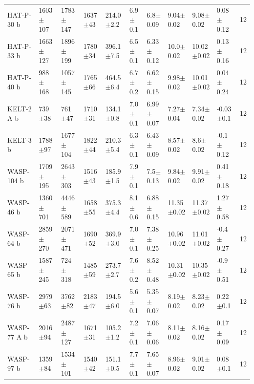 \begin{subappendices}
{\begin{landscape}
\begin{longtable}{llllllllllc}
  HAT-P-30 b  &    1603$\pm$107 &    1783$\pm$147 &   1637$\pm$43 &    214.0$\pm$2.2 &   6.9$\pm$0.1 &    6.8$\pm$0.09 &   9.04$\pm$0.02 &   9.08$\pm$0.02 &   0.08$\pm$0.12 &       12 \\
  HAT-P-33 b  &    1663$\pm$127 &    1896$\pm$199 &   1780$\pm$34 &    396.1$\pm$7.5 &   6.5$\pm$0.1 &   6.33$\pm$0.12 &   10.0$\pm$0.02 &  10.02$\pm$0.02 &   0.13$\pm$0.16 &       12 \\
  HAT-P-40 b  &     988$\pm$168 &    1057$\pm$145 &   1765$\pm$66 &    464.5$\pm$6.4 &   6.7$\pm$0.2 &   6.62$\pm$0.15 &   9.98$\pm$0.02 &  10.01$\pm$0.02 &   0.04$\pm$0.24 &       12 \\
  KELT-2 A b  &      739$\pm$38 &      761$\pm$47 &   1710$\pm$31 &    134.1$\pm$0.8 &   7.0$\pm$0.1 &   6.99$\pm$0.07 &   7.27$\pm$0.04 &   7.34$\pm$0.02 &   -0.03$\pm$0.1 &       12 \\
  KELT-3 b    &     1788$\pm$97 &    1677$\pm$104 &   1822$\pm$44 &    210.3$\pm$5.4 &   6.3$\pm$0.1 &   6.43$\pm$0.09 &   8.57$\pm$0.02 &    8.6$\pm$0.02 &   -0.1$\pm$0.12 &       12 \\
  WASP-104 b  &    1709$\pm$195 &    2643$\pm$303 &   1516$\pm$43 &    185.9$\pm$1.5 &   7.9$\pm$0.1 &    7.5$\pm$0.13 &   9.84$\pm$0.02 &   9.91$\pm$0.02 &   0.41$\pm$0.18 &       12 \\
  WASP-46 b   &    1360$\pm$701 &    4446$\pm$589 &   1658$\pm$55 &    375.3$\pm$4.4 &   8.1$\pm$0.6 &   6.88$\pm$0.15 &  11.35$\pm$0.02 &  11.37$\pm$0.02 &   1.27$\pm$0.58 &       12 \\
  WASP-64 b   &    2859$\pm$270 &    2071$\pm$471 &   1690$\pm$52 &    369.9$\pm$3.0 &   7.0$\pm$0.1 &   7.38$\pm$0.25 &  10.96$\pm$0.02 &  11.01$\pm$0.02 &   -0.4$\pm$0.27 &       12 \\
  WASP-65 b   &    1587$\pm$245 &     724$\pm$318 &   1485$\pm$59 &    273.7$\pm$2.7 &   7.6$\pm$0.2 &   8.52$\pm$0.48 &  10.31$\pm$0.02 &  10.35$\pm$0.02 &   -0.9$\pm$0.51 &       12 \\
  WASP-76 b   &     2979$\pm$63 &     3762$\pm$82 &   2183$\pm$47 &    194.5$\pm$6.0 &   5.6$\pm$0.1 &   5.35$\pm$0.07 &   8.19$\pm$0.02 &   8.23$\pm$0.02 &    0.22$\pm$0.1 &       12 \\
  WASP-77 A b &     2016$\pm$94 &    2487$\pm$127 &   1671$\pm$31 &    105.2$\pm$1.2 &   7.2$\pm$0.1 &   7.06$\pm$0.06 &   8.11$\pm$0.02 &   8.16$\pm$0.02 &   0.17$\pm$0.09 &       12 \\
  WASP-97 b   &     1359$\pm$84 &    1534$\pm$101 &   1540$\pm$42 &    151.1$\pm$0.5 &   7.7$\pm$0.1 &   7.65$\pm$0.07 &   8.96$\pm$0.02 &   9.01$\pm$0.02 &    0.08$\pm$0.1 &       12 \\

\end{longtable}
\end{landscape}}
\end{subappendices}
